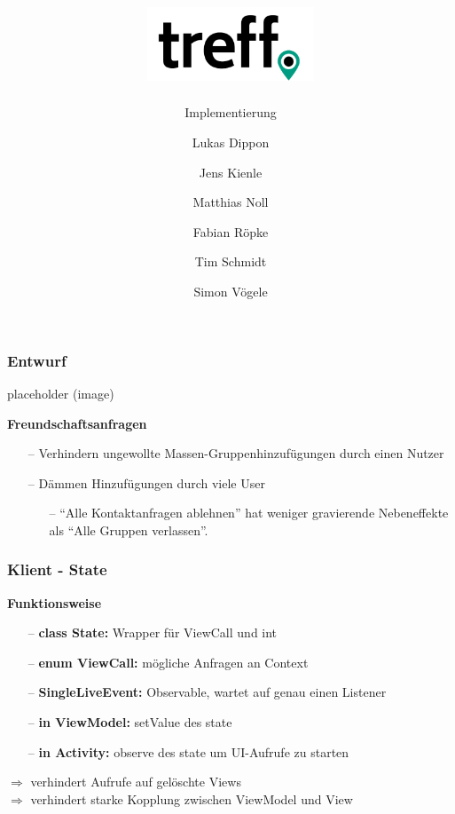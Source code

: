 \documentclass[aspectratio=1610]{beamer}
\title{\includegraphics[width = 50mm]{images/logo_crop.png}}
\subtitle{\huge Implementierung}
\author{Lukas Dippon
	\and Jens Kienle
	\and Matthias Noll
	\and Fabian Röpke
	\and Tim Schmidt
	\and Simon Vögele}
\begin{document}
	\begin{frame}[plain]
	\maketitle
	\end{frame}

	\begin{frame}[plain]
		\frametitle{Entwurf}

		\begin{minipage}{0.5\textwidth}
		placeholder (image)
		\end{minipage}%
		\begin{minipage}{0.5\textwidth}
		\textbf{Freundschaftsanfragen}
		\begin{itemize}
			\setlength\itemsep{0.3em}
            \item[--] Verhindern ungewollte Massen-Gruppenhinzufügungen durch
                einen Nutzer
            \item[--] Dämmen Hinzufügungen durch viele User
                \begin{itemize}
                    \item[--] \enquote{Alle Kontaktanfragen ablehnen} hat
                        weniger gravierende Nebeneffekte als \enquote{Alle
                        Gruppen verlassen}.
                \end{itemize}
		\end{itemize}
		\end{minipage}

	\end{frame}

	\begin{frame}[plain]
		\frametitle{Klient - State}
		\textbf{Funktionsweise}
		\begin{itemize}
			\setlength\itemsep{0.3em}
			\item[--] \textbf{class State:} Wrapper für ViewCall und int
			\item[--] \textbf{enum ViewCall:} mögliche Anfragen an Context
			\item[--] \textbf{SingleLiveEvent:} Observable, wartet auf 
			genau einen Listener
			\item[--] \textbf{in ViewModel:} setValue des state
			\item[--] \textbf{in Activity:} observe des state um UI-Aufrufe 
			zu starten
		\end{itemize}
	$\Rightarrow$ verhindert Aufrufe auf gelöschte Views \\
	$\Rightarrow$ verhindert starke Kopplung zwischen ViewModel und View
	\end{frame}
\end{document}
